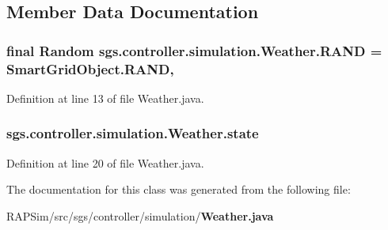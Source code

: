 \subsection{Member Data Documentation}
\subsubsection[{R\-A\-N\-D}]{\setlength{\rightskip}{0pt plus 5cm}final Random sgs.\-controller.\-simulation.\-Weather.\-R\-A\-N\-D = Smart\-Grid\-Object.\-R\-A\-N\-D\hspace{0.3cm}{\ttfamily [static]}, {\ttfamily [protected]}}\label{classsgs_1_1controller_1_1simulation_1_1_weather_aee10e9b55ad4d2856dd8f7a56fa13c2d}


Definition at line 13 of file Weather.\-java.

\subsubsection[{state}]{ sgs.\-controller.\-simulation.\-Weather.\-state}\label{classsgs_1_1controller_1_1simulation_1_1_weather_a3215ff314f668de65aa34ea050e0e125}


Definition at line 20 of file Weather.\-java.



The documentation for this class was generated from the following file\-:\begin{DoxyCompactItemize}
\item 
R\-A\-P\-Sim/src/sgs/controller/simulation/{\bf Weather.\-java}\end{DoxyCompactItemize}
